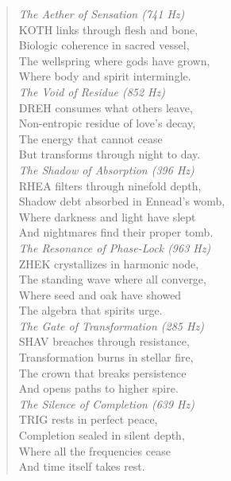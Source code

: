 \begin{verse}
\textit{The Aether of Sensation (741 Hz)}\\
KOTH links through flesh and bone,\\
Biologic coherence in sacred vessel,\\
The wellspring where gods have grown,\\
Where body and spirit intermingle.\\

\textit{The Void of Residue (852 Hz)}\\
DREH consumes what others leave,\\
Non-entropic residue of love's decay,\\
The energy that cannot cease\\
But transforms through night to day.\\

\textit{The Shadow of Absorption (396 Hz)}\\
RHEA filters through ninefold depth,\\
Shadow debt absorbed in Ennead's womb,\\
Where darkness and light have slept\\
And nightmares find their proper tomb.\\

\textit{The Resonance of Phase-Lock (963 Hz)}\\
ZHEK crystallizes in harmonic node,\\
The standing wave where all converge,\\
Where seed and oak have showed\\
The algebra that spirits urge.\\

\textit{The Gate of Transformation (285 Hz)}\\
SHAV breaches through resistance,\\
Transformation burns in stellar fire,\\
The crown that breaks persistence\\
And opens paths to higher spire.\\

\textit{The Silence of Completion (639 Hz)}\\
TRIG rests in perfect peace,\\
Completion sealed in silent depth,\\
Where all the frequencies cease\\
And time itself takes rest.\\
\end{verse}


